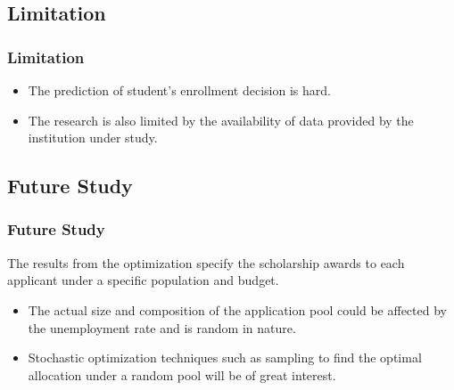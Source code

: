 \documentclass{beamer}
\begin{document}
\subsection{Limitation}
\begin{frame}
\frametitle{Limitation}
\begin{itemize}
\item The prediction of student's enrollment decision is 
hard.
\item The research is also limited by the availability of 
data provided by the institution under study.
\end{itemize}


\end{frame}

\subsection{Future Study}
\begin{frame}
\frametitle{Future Study}
The results from the optimization specify the scholarship awards to each applicant under a 
specific population and budget.  
\begin{itemize}
\item  The actual size and composition of the application pool could be affected by the 
       unemployment rate and is random in nature. 
\item  Stochastic optimization techniques such as sampling to find the optimal allocation 
under a random pool will be of great interest. 

\end{itemize}

\end{frame}
\end{document}
